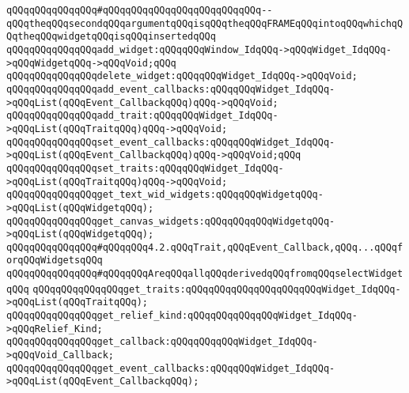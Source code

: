 \newline
\verb|qQQqqQQqqQQqqQQq#qQQqqQQqqQQqqQQqqQQqqQQqqQQq--qQQqtheqQQqsecondqQQqargumentqQQqisqQQqtheqQQqFRAMEqQQqintoqQQqwhichqQQqtheqQQqwidgetqQQqisqQQqinsertedqQQq|\newline
\verb|qQQqqQQqqQQqqQQqadd_widget:qQQqqQQqWindow_IdqQQq->qQQqWidget_IdqQQq->qQQqWidgetqQQq->qQQqVoid;qQQq|\newline
\verb|qQQqqQQqqQQqqQQqdelete_widget:qQQqqQQqWidget_IdqQQq->qQQqVoid;|\newline
\newline
\verb|qQQqqQQqqQQqqQQqadd_event_callbacks:qQQqqQQqWidget_IdqQQq->qQQqList(qQQqEvent_CallbackqQQq)qQQq->qQQqVoid;|\newline
\verb|qQQqqQQqqQQqqQQqadd_trait:qQQqqQQqWidget_IdqQQq->qQQqList(qQQqTraitqQQq)qQQq->qQQqVoid;|\newline
\newline
\verb|qQQqqQQqqQQqqQQqset_event_callbacks:qQQqqQQqWidget_IdqQQq->qQQqList(qQQqEvent_CallbackqQQq)qQQq->qQQqVoid;qQQq|\newline
\verb|qQQqqQQqqQQqqQQqset_traits:qQQqqQQqWidget_IdqQQq->qQQqList(qQQqTraitqQQq)qQQq->qQQqVoid;|\newline
\newline
\newline
\verb|qQQqqQQqqQQqqQQqget_text_wid_widgets:qQQqqQQqWidgetqQQq->qQQqList(qQQqWidgetqQQq);|\newline
\verb|qQQqqQQqqQQqqQQqget_canvas_widgets:qQQqqQQqqQQqWidgetqQQq->qQQqList(qQQqWidgetqQQq);|\newline
\newline
\newline
\newline
\verb|qQQqqQQqqQQqqQQq#qQQqqQQq4.2.qQQqTrait,qQQqEvent_Callback,qQQq...qQQqforqQQqWidgetsqQQq|\newline
\newline
\verb|qQQqqQQqqQQqqQQq#qQQqqQQqAreqQQqallqQQqderivedqQQqfromqQQqselectWidgetqQQq|\newline
\verb|qQQqqQQqqQQqqQQqget_traits:qQQqqQQqqQQqqQQqqQQqqQQqWidget_IdqQQq->qQQqList(qQQqTraitqQQq);|\newline
\verb|qQQqqQQqqQQqqQQqget_relief_kind:qQQqqQQqqQQqqQQqWidget_IdqQQq->qQQqRelief_Kind;|\newline
\verb|qQQqqQQqqQQqqQQqget_callback:qQQqqQQqqQQqWidget_IdqQQq->qQQqVoid_Callback;|\newline
\verb|qQQqqQQqqQQqqQQqget_event_callbacks:qQQqqQQqWidget_IdqQQq->qQQqList(qQQqEvent_CallbackqQQq);|\newline
